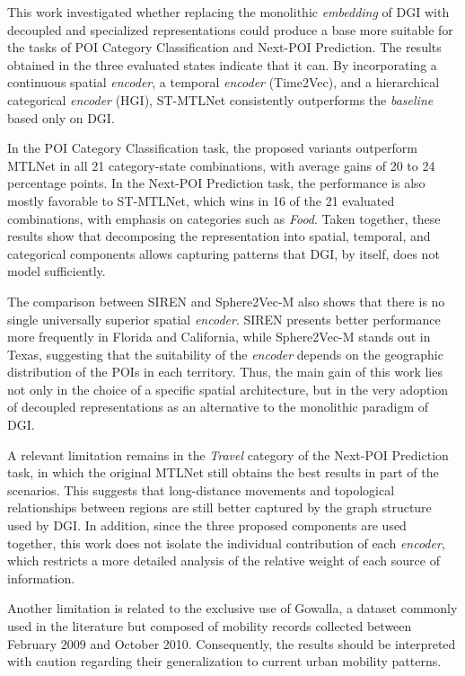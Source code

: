 This work investigated whether replacing the monolithic \textit{embedding} of DGI with decoupled and specialized representations could produce a base more suitable for the tasks of POI Category Classification and Next-POI Prediction. The results obtained in the three evaluated states indicate that it can. By incorporating a continuous spatial \textit{encoder}, a temporal \textit{encoder} (Time2Vec), and a hierarchical categorical \textit{encoder} (HGI), ST-MTLNet consistently outperforms the \textit{baseline} based only on DGI.

In the POI Category Classification task, the proposed variants outperform MTLNet in all 21 category-state combinations, with average gains of 20 to 24 percentage points. In the Next-POI Prediction task, the performance is also mostly favorable to ST-MTLNet, which wins in 16 of the 21 evaluated combinations, with emphasis on categories such as \textit{Food}. Taken together, these results show that decomposing the representation into spatial, temporal, and categorical components allows capturing patterns that DGI, by itself, does not model sufficiently.

The comparison between SIREN and Sphere2Vec-M also shows that there is no single universally superior spatial \textit{encoder}. SIREN presents better performance more frequently in Florida and California, while Sphere2Vec-M stands out in Texas, suggesting that the suitability of the \textit{encoder} depends on the geographic distribution of the POIs in each territory. Thus, the main gain of this work lies not only in the choice of a specific spatial architecture, but in the very adoption of decoupled representations as an alternative to the monolithic paradigm of DGI.

A relevant limitation remains in the \textit{Travel} category of the Next-POI Prediction task, in which the original MTLNet still obtains the best results in part of the scenarios. This suggests that long-distance movements and topological relationships between regions are still better captured by the graph structure used by DGI. In addition, since the three proposed components are used together, this work does not isolate the individual contribution of each \textit{encoder}, which restricts a more detailed analysis of the relative weight of each source of information.

Another limitation is related to the exclusive use of Gowalla, a dataset commonly used in the literature but composed of mobility records collected between February 2009 and October 2010. Consequently, the results should be interpreted with caution regarding their generalization to current urban mobility patterns.

